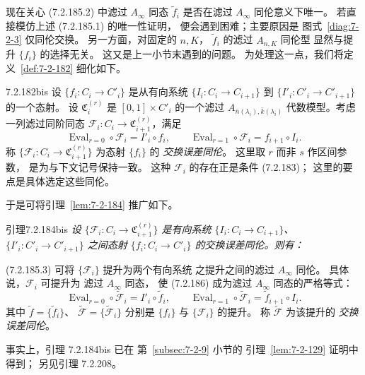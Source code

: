 现在关心 (7.2.185.2) 中滤过
$A_\infty$ 同态 $\widetilde f_i$
是否在滤过 $A_\infty$ 同伦意义下唯一。
若直接模仿上述 (7.2.185.1) 的唯一性证明，
便会遇到困难；主要原因是
图式~\ref{diag:7-2-3} 仅同伦交换。
另一方面，对固定的 $n,K$，
$\widetilde f_i$ 的滤过 $A_{n,K}$ 同伦型
显然与提升 $\{f_i\}$ 的选择无关。
这又是上一小节末遇到的问题。
为处理这一点，我们将定义~\ref{def:7-2-182}
细化如下。

\begin{definition}{7.2.182bis}\label{def:7-2-182bis}
设 $\{f_i\colon C_i\to C'_i\}$
是从有向系统
$\{I_i\colon C_i\to C_{i+1}\}$
到 $\{I'_i\colon C'_i\to C'_{i+1}\}$
的一个态射。
设 $\mathfrak C_i^{(r)}$ 是
$[0,1]\times C'_i$ 的一个滤过
$A_{\bar n(\lambda_i),\bar k(\lambda_i)}$
代数模型。考虑一列滤过同阶同态
$\mathcal F_i\colon C_i\to
\mathfrak C_{i+1}^{(r)}$，满足
\begin{equation}
\operatorname{Eval}_{r=0}\circ\mathcal F_i
=I'_i\circ f_i,
\qquad
\operatorname{Eval}_{r=1}\circ\mathcal F_i
=f_{i+1}\circ I_i.
\tag{7.2.186}\label{eq:7-2-186}
\end{equation}
称 $\{\mathcal F_i\colon C_i\to
\mathfrak C_{i+1}^{(r)}\}$
为态射 $\{f_i\}$ 的
\emph{交换误差同伦}。
这里取 $r$ 而非 $s$ 作区间参数，
是为与下文记号保持一致。
这种 $\mathcal F_i$ 的存在正是条件 (7.2.183)；
这里的要点是具体选定这些同伦。
\end{definition}

于是可将引理~\ref{lem:7-2-184} 推广如下。

\begin{statement}{引理}{7.2.184bis}\label{lem:7-2-184bis}\itshape
设 $\{\mathcal F_i\colon C_i\to
\mathfrak C_{i+1}^{(r)}\}$
是有向系统
$\{I_i\colon C_i\to C_{i+1}\}$、
$\{I'_i\colon C'_i\to C'_{i+1}\}$
之间态射 $\{f_i\colon C_i\to C'_i\}$
的交换误差同伦。则有：

\noindent\textup{(7.2.185.3)}
可将 $\{\mathcal F_i\}$ 提升为两个有向系统
之提升之间的滤过 $A_\infty$ 同伦。
具体说，$\mathcal F_i$ 可提升为
滤过 $A_\infty$ 同态，
使 (7.2.186) 成为滤过
$A_\infty$ 同态的严格等式：
\[
\operatorname{Eval}_{r=0}\circ\widetilde{\mathcal F}_i
=I'_i\circ\widetilde f_i,
\qquad
\operatorname{Eval}_{r=1}\circ\widetilde{\mathcal F}_i
=\widetilde f_{i+1}\circ I_i.
\]
其中 $\widetilde f=\{\widetilde f_i\}$、
$\widetilde{\mathcal F}=\{\widetilde{\mathcal F}_i\}$
分别是 $\{f_i\}$ 与 $\{\mathcal F_i\}$ 的提升。
称 $\widetilde{\mathcal F}$ 为该提升的
\emph{交换误差同伦}。
\end{statement}

事实上，引理 7.2.184bis 已在
第~\ref{subsec:7-2-9} 小节的
引理~\ref{lem:7-2-129} 证明中得到；
另见引理 7.2.208。


